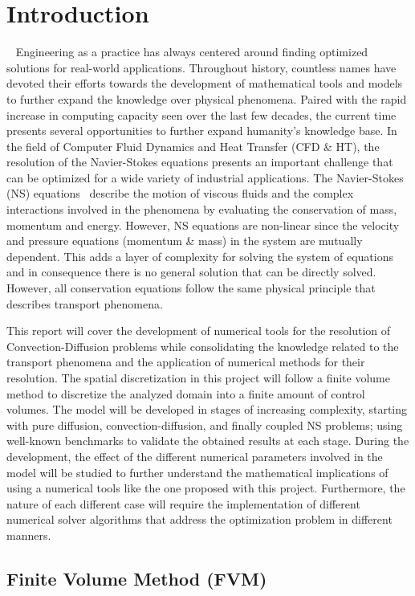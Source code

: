 \section*{Introduction}~\label{chapIntroduction}
Engineering as a practice has always centered around finding optimized solutions for real-world applications. Throughout history, countless names have devoted their efforts towards the development of mathematical tools and models to further expand the knowledge over physical phenomena. Paired with the rapid increase in computing capacity seen over the last few decades, the current time presents several opportunities to further expand humanity's knowledge base. In the field of Computer Fluid Dynamics and Heat Transfer (CFD \& HT), the resolution of the Navier-Stokes equations presents an important challenge that can be optimized for a wide variety of industrial applications. The Navier-Stokes (NS) equations~\cite{Shames2003} describe the motion of viscous fluids and the complex interactions involved in the phenomena by evaluating the conservation of mass, momentum and energy. However, NS equations are non-linear since the velocity and pressure equations (momentum \& mass) in the system are mutually dependent. This adds a layer of complexity for solving the system of equations and in consequence there is no general solution that can be directly solved. However, all conservation equations follow the same physical principle that describes transport phenomena.

This report will cover the development of numerical tools for the resolution of Convection-Diffusion problems while consolidating the knowledge related to the transport phenomena and the application of numerical methods for their resolution. The spatial discretization in this project will follow a finite volume method to discretize the analyzed domain into a finite amount of control volumes. The model will be developed in stages of increasing complexity, starting with pure diffusion, convection-diffusion, and finally coupled NS problems; using well-known benchmarks to validate the obtained results at each stage. During the development, the effect of the different numerical parameters involved in the model will be studied to further understand the mathematical implications of using a numerical tools like the one proposed with this project. Furthermore, the nature of each different case will require the implementation of different numerical solver algorithms that address the optimization problem in different manners.


\subsection*{Finite Volume Method (FVM)}

